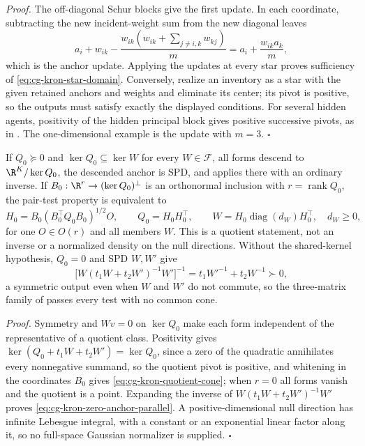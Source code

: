 \noindent\emph{Proof.}
The off-diagonal Schur blocks give the first update. In each coordinate,
subtracting the new incident-weight sum from the new diagonal leaves
\begin{equation}
a_i+w_{ik}
-\frac{w_{ik}(w_{ik}+\sum_{j\neq i,k}w_{kj})}{m}
=a_i+\frac{w_{ik}a_k}{m},
\label{eq:cg-kron-scalar-anchor-remainder}
\end{equation}
which is the anchor update. Applying the updates at every star proves
sufficiency of \eqref{eq:cg-kron-star-domain}. Conversely, realize an inventory
as a star with the given retained anchors and weights and eliminate its center;
its pivot is positive, so the outputs must satisfy exactly the displayed
conditions. For several hidden agents, positivity of the hidden principal block
gives positive successive pivots, as in .
The one-dimensional example is the update with \(m=3\). \(\square\)

If \(Q_0\succeq0\) and \(\ker Q_0\subseteq\ker W\) for every
\(W\in\mathscr F\), all forms descend to \(\R^K/\ker Q_0\), the descended anchor
is SPD, and  applies there with an
ordinary inverse. If \(B_0:\R^{r}\to(\ker Q_0)^\perp\) is an orthonormal
inclusion with \(r=\operatorname{rank}Q_0\), the pair-test property is
equivalent to
\begin{equation}
H_0=B_0(B_0^\top Q_0B_0)^{1/2}O,\qquad
Q_0=H_0H_0^\top,\qquad
W=H_0\operatorname{diag}(d_W)H_0^\top,\quad d_W\geq0,
\label{eq:cg-kron-quotient-cone}
\end{equation}
for one \(O\in O(r)\) and all members \(W\). This is a quotient statement, not
an inverse or a normalized density on the null directions. Without the
shared-kernel hypothesis, \(Q_0=0\) and SPD \(W,W'\) give
\begin{equation}
\bigl[W(t_1W+t_2W')^{-1}W'\bigr]^{-1}=t_1W'^{-1}+t_2W^{-1}\succ0,
\label{eq:cg-kron-zero-anchor-parallel}
\end{equation}
a symmetric output even when \(W\) and \(W'\) do not commute, so the
three-matrix family of  passes
every test with no common cone. 

\noindent\emph{Proof.}
Symmetry and \(Wv=0\) on \(\ker Q_0\) make each form independent of the
representative of a quotient class. Positivity gives
\(\ker(Q_0+t_1W+t_2W')=\ker Q_0\), since a zero of the quadratic annihilates
every nonnegative summand, so the quotient pivot is positive, and whitening in
the coordinates \(B_0\) gives \eqref{eq:cg-kron-quotient-cone}; when \(r=0\) all
forms vanish and the quotient is a point. Expanding the inverse of
\(W(t_1W+t_2W')^{-1}W'\) proves \eqref{eq:cg-kron-zero-anchor-parallel}. A
positive-dimensional null direction has infinite Lebesgue integral, with a
constant or an exponential linear factor along it, so no full-space Gaussian
normalizer is supplied. \(\square\)

